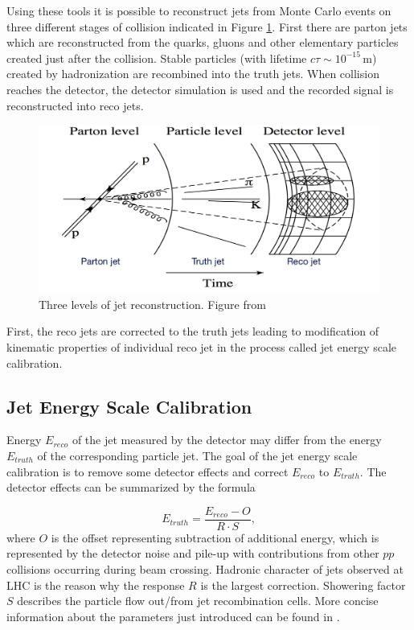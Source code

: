 Using these tools it is possible to reconstruct jets from Monte Carlo events on three
different stages of collision indicated in Figure \ref{fig:JetPhases}. First
there are parton jets which are reconstructed from the quarks, gluons and other
elementary particles created just after the collision. Stable particles (with
lifetime $c\tau \sim 10^{-15}\,\text{m}$) created by hadronization are recombined into
the truth jets. When collision reaches the detector, the detector simulation
is used and the recorded signal is reconstructed into reco jets.

\begin{figure}[t]
  \centering
  \includegraphics[width=\textwidth]{Chapter2/JetPhases.png}
  \caption[Three levels of jet reconstruction.]
    {Three levels of jet reconstruction. Figure from \cite{ZdenekThesis} } \label{fig:JetPhases}
\end{figure}

First, the reco jets are corrected to the truth jets leading to modification
of kinematic properties of individual reco jet in the process called jet energy
scale calibration. 

\subsection{Jet Energy Scale Calibration}

Energy $E_{reco}$ of the jet measured by the detector may differ from the energy
$E_{truth}$ of the corresponding particle jet. The goal of the jet energy scale
calibration is to remove some detector effects and correct $E_{reco}$ to
$E_{truth}$. The detector effects can be summarized by the formula

\begin{equation}
  E_{truth} = \frac{E_{reco} - O}{R \cdot S},
\end{equation}
where $O$ is the offset representing subtraction of additional energy,
which is represented by the detector noise and pile-up with contributions from
other $pp$ collisions occurring during beam crossing. Hadronic character of
jets observed at LHC is the reason why the response $R$ is the largest
correction. Showering factor $S$ describes the particle flow out/from jet
recombination cells. More concise information about the parameters just
introduced can be found in \cite{ZdenekThesis}.

